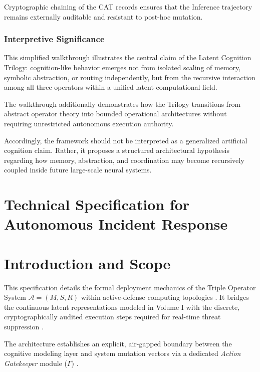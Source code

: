 Cryptographic chaining of the CAT records ensures that the Inference trajectory remains externally auditable and resistant
to post-hoc mutation.

\subsection*{Interpretive Significance}

This simplified walkthrough illustrates the central claim of the Latent Cognition Trilogy: cognition-like behavior emerges
not from isolated scaling of memory, symbolic abstraction, or
routing independently, but from the recursive interaction among
all three operators within a unified latent computational field.

The walkthrough additionally demonstrates how the Trilogy
transitions from abstract operator theory into bounded
operational architectures without requiring unrestricted
autonomous execution authority.

Accordingly, the framework should not be interpreted as a
generalized artificial cognition claim. Rather, it proposes a
structured architectural hypothesis regarding how memory, abstraction, and coordination may become recursively coupled
inside future large-scale neural systems.
\appendix 
\chapter{Technical Specification for Autonomous Incident Response} 
\label{ch:appendix_manifesto}

\chapter{Introduction and Scope}
This specification details the formal deployment mechanics of the Triple Operator System $\mathcal{A} = (M, S, R)$ within active-defense computing topologies \cite{Realignment:TripleOperators,Bahdanau2016,DLI:MemoryIntegration}. It bridges the continuous latent representations modeled in Volume I with the discrete, cryptographically audited execution steps required for real-time threat suppression \cite{Realignment:TripleOperators}. 

The architecture establishes an explicit, air-gapped boundary between the cognitive modeling layer and system mutation vectors via a dedicated \textit{Action Gatekeeper} module ($\Gamma$) \cite{Manifesto:IncidentResponse,Realignment:TripleOperators}.
%            
